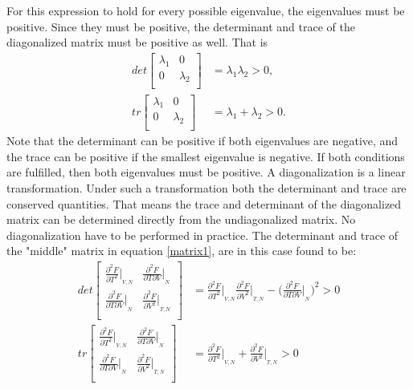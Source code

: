 For this expression to hold for every possible eigenvalue, the eigenvalues must be positive. Since they must be positive, the determinant and trace of the diagonalized matrix must be positive as well. That is
\begin{equation}
	\begin{split}
		det
		\begin{bmatrix}
			\lambda_1       & 0  \\
			0       &
			\lambda_2
			\\
		\end{bmatrix}&=\lambda_1 \lambda_2 >0,\\
		tr
		\begin{bmatrix}
			\lambda_1       & 0  \\
			0       &
			\lambda_2
			\\
		\end{bmatrix}&=\lambda_1 + \lambda_2 >0.
	\end{split}
\end{equation} 
Note that the determinant can be positive if both eigenvalues are negative, and the trace can be positive if the smallest eigenvalue is negative. If both conditions are fulfilled, then both eigenvalues must be positive. A diagonalization is a linear transformation. Under such a transformation both the determinant and trace are conserved quantities. That means the trace and determinant of the diagonalized matrix can be determined directly from the undiagonalized matrix. No diagonalization have to be performed in practice. The determinant and trace of the "middle" matrix in equation \ref{matrix1}, are in this case found to be:
\begin{equation}
	\begin{split}
		det
		\begin{bmatrix}
			\frac{\partial^2 F}{\partial T^2}\bigg|_{_{V,N}}       & \frac{\partial^2 F}{\partial T \partial V}\bigg|_{_{N}}  \\
			\frac{\partial^2 F}{\partial T \partial V}\bigg|_{_{N}}       &
			\frac{\partial^2 F}{\partial V^2}\bigg|_{_{T,N}}
			\\
		\end{bmatrix}
		&=\frac{\partial^2 F}{\partial T^2}\bigg|_{_{V,N}}\frac{\partial^2 F}{\partial V^2}\bigg|_{_{T,N}}-\bigg(\frac{\partial^2 F}{\partial T \partial V}\bigg|_{_{N}}\bigg)^2 >0\\
		tr
		\begin{bmatrix}
			\frac{\partial^2 F}{\partial T^2}\bigg|_{_{V,N}}       & \frac{\partial^2 F}{\partial T \partial V}\bigg|_{_{N}}  \\
			\frac{\partial^2 F}{\partial T \partial V}\bigg|_{_{N}}       &
			\frac{\partial^2 F}{\partial V^2}\bigg|_{_{T,N}}
			\\
		\end{bmatrix}
		&=\frac{\partial^2 F}{\partial T^2}\bigg|_{_{V,N}}+\frac{\partial^2 F}{\partial V^2}\bigg|_{_{T,N}}>0
	\end{split}
	\label{det}
\end{equation} 
